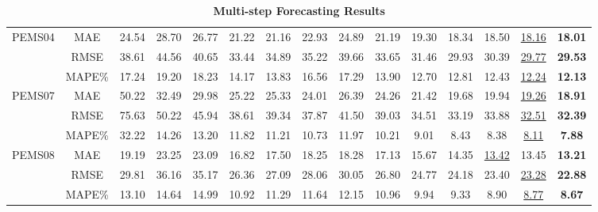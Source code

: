 \documentclass[final,12pt]{elsarticle}
\begin{document}
\begin{landscape}
\begin{table}[h]
\begin{subtable}[h]{0.48\textwidth}
\begin{center}
\begin{tabular}{|*{15}{c|}}
    \hline
    \multirow{3}{*}{PEMS04} 
    & MAE     & 24.54 & 28.70 & 26.77 & 21.22 
              & 21.16 & 22.93 & 24.89 & 21.19 
              & 19.30 & 18.34 & 18.50 & \underline{18.16}     & \textbf{18.01}  \\
    \cline{2-15}
    & RMSE    & 38.61 & 44.56 & 40.65 & 33.44 
              & 34.89 & 35.22 & 39.66 & 33.65 
              & 31.46 & 29.93 & 30.39 & \underline{29.77}     & \textbf{29.53}  \\
    \cline{2-15}
    & MAPE\%  & 17.24 & 19.20 & 18.23 & 14.17 
              & 13.83 & 16.56 & 17.29 & 13.90 
              & 12.70 & 12.81 & 12.43 & \underline{12.24}     & \textbf{12.13}  \\

    \hline
    \multirow{3}{*}{PEMS07} 
    & MAE     & 50.22 & 32.49 & 29.98 & 25.22 
              & 25.33 & 24.01 & 26.39 & 24.26 
              & 21.42 & 19.68 & 19.94 & \underline{19.26}     & \textbf{18.91}  \\
    \cline{2-15}
    & RMSE    & 75.63 & 50.22 & 45.94 & 38.61 
              & 39.34 & 37.87 & 41.50 & 39.03 
              & 34.51 & 33.19 & 33.88 & \underline{32.51}     & \textbf{32.39}  \\
    \cline{2-15}
    & MAPE\%  & 32.22 & 14.26 & 13.20 & 11.82 
              & 11.21 & 10.73 & 11.97 & 10.21 
              & 9.01  & 8.43  & 8.38  & \underline{8.11}      & \textbf{7.88}   \\

    \hline
    \multirow{3}{*}{PEMS08} 
    & MAE     & 19.19 & 23.25 & 23.09 & 16.82 
              & 17.50 & 18.25 & 18.28 & 17.13 
              & 15.67 & 14.35 & \underline{13.42} & 13.45     & \textbf{13.21}  \\
    \cline{2-15}
    & RMSE    & 29.81 & 36.16 & 35.17 & 26.36 
              & 27.09 & 28.06 & 30.05 & 26.80 
              & 24.77 & 24.18 & 23.40 & \underline{23.28}     & \textbf{22.88}  \\
    \cline{2-15}
    & MAPE\%  & 13.10 & 14.64 & 14.99 & 10.92 
              & 11.29 & 11.64 & 12.15 & 10.96 
              & 9.94  & 9.33  & 8.90  & \underline{8.77}      & \textbf{8.67}   \\

    \hline

  \end{tabular}
  \end{center}

  \end{subtable}
  \setlength{\abovecaptionskip}{-2pt}
  \caption{\textbf{Multi-step Forecasting Results}}


  \end{table}


\end{landscape}
\end{document}
